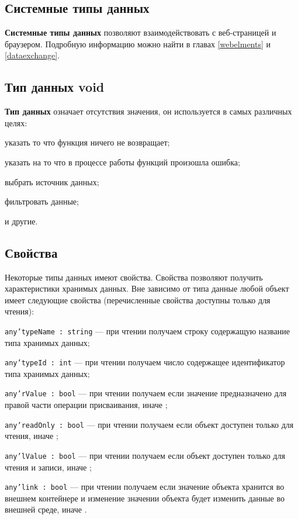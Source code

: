 \subsection{Системные типы данных}

{\bf Системные типы данных} позволяют взаимодействовать с веб-страницей и браузером. Подробную информацию можно найти в главах \ref{webelments} и \ref{dataexchange}.

\subsection{Тип данных {\color{lightblue} void}}

{\bf Тип данных \void{}} означает отсутствия значения, он используется в самых различных целях:

\begin{icItems}
\item
	указать то что функция ничего не возвращает;
\item
	указать на то что в процессе работы функций произошла ошибка;
\item
	выбрать источник данных;
\item
	фильтровать данные;
\item
	и другие.
\end{icItems}


\subsection{Свойства}

Некоторые типы данных имеют свойства. Свойства позволяют получить характеристики хранимых данных. Вне зависимо от типа данные любой объект имеет следующие свойства (перечисленные свойства доступны только для чтения):

\begin{icItems}
\item
	\texttt{any'typeName : string} — при чтении получаем строку содержащую название типа хранимых данных;
\item
	\texttt{any'typeId : int} — при чтении получаем число содержащее идентификатор типа хранимых данных;
\item
	\texttt{any'rValue : bool} — при чтении получаем \true{} если значение предназначено для правой части операции присваивания, иначе \false{};
\item
	\texttt{any'readOnly : bool} — при чтении получаем \true{} если объект доступен только для чтения, иначе \false{};
\item
	\texttt{any'lValue : bool} — при чтении получаем \true{} если объект доступен только для чтения и записи, иначе \false{};
\item
	\texttt{any'link : bool} — при чтении получаем \true{} если значение объекта хранится во внешнем контейнере и изменение значении объекта будет изменить данные во внешней среде, иначе \false{}.
\end{icItems}

